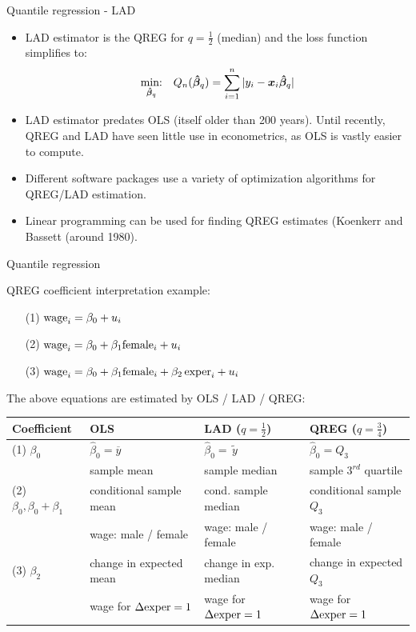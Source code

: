 \documentclass{beamer}
\begin{document}
\begin{frame}{Quantile regression - LAD}
\begin{itemize}
\item LAD estimator is the QREG for $q=\tfrac{1}{2}$ (median) and the loss function simplifies to: $$
\underset{\bm{\hat{\beta}}_{q}}{\textnormal{min:}} \quad Q_n(\bm{\hat{\beta}}_{q}) =
\sum_{i=1}^n |y_i-\bm{x}_i\bm{\hat{\beta}}_{q}|
$$
\item LAD estimator predates OLS (itself older than 200 years). Until recently, QREG and LAD have seen little use in econometrics, as OLS is vastly easier to compute.
\item Different software packages use a variety of optimization algorithms for QREG/LAD estimation.
\item Linear programming can be used for finding QREG estimates (Koenkerr and Bassett (around 1980).
\end{itemize}
\end{frame}
\begin{frame}{Quantile regression}

QREG coefficient interpretation example:\\
\bigskip
\begin{itemize}
    \item[(1)] $\textnormal{wage}_i = \beta_0 + u_i$
    \item[(2)] $\textnormal{wage}_i = \beta_0 + \beta_1 \textnormal{female}_i + u_i$
    \item[(3)] $\textnormal{wage}_i = \beta_0 + \beta_1 \textnormal{female}_i + \beta_2 \, \textnormal{exper}_i + u_i$
\end{itemize}
\bigskip
The above equations are estimated by OLS / LAD / QREG:\\
\bigskip
\tiny
\begin{tabular}{|l| l |l |l|}
 \hline
 Coefficient   &     OLS     &   LAD ($q=\tfrac{1}{2}$)   &  QREG ($q=\tfrac{3}{4}$)\\
 \hline 
 (1) $\beta_0$ &   $\hat{\beta}_0=\overline{y}$ & $\hat{\beta}_0=\tilde{\,y\,}$ & $\hat{\beta}_0=Q_3$\\
 & sample mean  & sample median & sample $3^{rd}$ quartile\\
 \hline
 (2) $\beta_0, \beta_0\!+\!\beta_1$ & conditional sample mean & cond. sample median & conditional sample $Q_3$\\
  & wage: male / female & wage: male / female & wage: male / female \\
  \hline
  (3) $\beta_2$ & change in expected mean & change in exp. median & change in expected $Q_3$\\
   & wage for $\Delta\textnormal{exper}=1$ & wage for $\Delta\textnormal{exper}=1$ & wage for $\Delta\textnormal{exper}=1$\\
   \hline
\end{tabular}
\end{frame}
\end{document}
